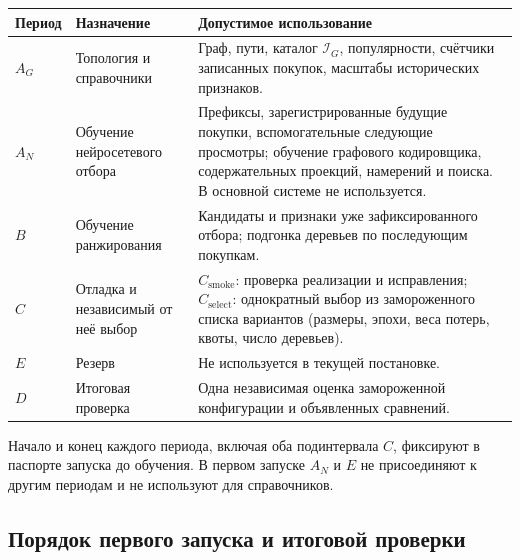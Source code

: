 \documentclass[12pt,a4paper]{article}
\theoremstyle{plainru}
\begin{document}
{\small
\begin{longtable}{L{0.10\textwidth}L{0.30\textwidth}L{0.47\textwidth}}
\toprule Период & Назначение & Допустимое использование \\\midrule\endhead
$A_G$ & Топология и справочники &
Граф, пути, каталог $\mathcal I_G$, популярности, счётчики записанных покупок,
масштабы исторических признаков. \\
$A_N$ & Обучение нейросетевого отбора &
Префиксы, зарегистрированные будущие покупки, вспомогательные следующие просмотры;
обучение графового кодировщика, содержательных проекций, намерений и поиска.
В основной системе не используется. \\
$B$ & Обучение ранжирования &
Кандидаты и признаки уже зафиксированного отбора;
подгонка деревьев по последующим покупкам. \\
$C$ & Отладка и независимый от неё выбор &
$C_{\mathrm{smoke}}$: проверка реализации и исправления;
$C_{\mathrm{select}}$: однократный выбор из замороженного списка вариантов
(размеры, эпохи, веса потерь, квоты, число деревьев). \\
$E$ & Резерв & Не используется в текущей постановке. \\
$D$ & Итоговая проверка &
Одна независимая оценка замороженной конфигурации и объявленных сравнений. \\
\bottomrule
\end{longtable}}

Начало и конец каждого периода, включая оба подинтервала $C$,
фиксируют в паспорте запуска до обучения. В первом запуске $A_N$ и $E$
не присоединяют к другим периодам и не используют для справочников.

\subsection{Порядок первого запуска и итоговой проверки}
\label{sec:eval-stages}
\end{document}
